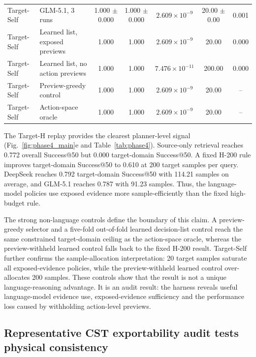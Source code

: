 \documentclass[final,1p,times]{elsarticle}
\begin{document}
\begin{table}[t]
\begin{tabular}{llccccc}
Target-Self & GLM-5.1, 3 runs & 1.000 $\pm$ 0.000 & 1.000 $\pm$ 0.000 & $2.609\times10^{-9}$ & 20.00 $\pm$ 0.00 & 0.001 \\
Target-Self & Learned list, exposed previews & 1.000 & 1.000 & $2.609\times10^{-9}$ & 20.00 & 0.000 \\
Target-Self & Learned list, no action previews & 1.000 & 1.000 & $7.476\times10^{-11}$ & 200.00 & 0.000 \\
Target-Self & Preview-greedy control & 1.000 & 1.000 & $2.609\times10^{-9}$ & 20.00 & -- \\
Target-Self & Action-space oracle & 1.000 & 1.000 & $2.609\times10^{-9}$ & 20.00 & -- \\
\bottomrule
\end{tabular}
\end{table}

The Target-H replay provides the clearest planner-level signal (Fig.~\ref{fig:phase4_main}e and Table~\ref{tab:phase4}). Source-only retrieval reaches 0.772 overall Success@50 but 0.000 target-domain Success@50. A fixed H-200 rule improves target-domain Success@50 to 0.610 at 200 target samples per query. DeepSeek reaches 0.792 target-domain Success@50 with 114.21 samples on average, and GLM-5.1 reaches 0.787 with 91.23 samples. Thus, the language-model policies use exposed evidence more sample-efficiently than the fixed high-budget rule.

The strong non-language controls define the boundary of this claim. A preview-greedy selector and a five-fold out-of-fold learned decision-list control reach the same constrained target-domain ceiling as the action-space oracle, whereas the preview-withheld learned control falls back to the fixed H-200 result. Target-Self further confirms the sample-allocation interpretation: 20 target samples saturate all exposed-evidence policies, while the preview-withheld learned control over-allocates 200 samples. These controls show that the result is not a unique language-reasoning advantage. It is an audit result: the harness reveals useful language-model evidence use, exposed-evidence sufficiency and the performance loss caused by withholding action-level previews.






\subsection{Representative CST exportability audit tests physical consistency}
\end{document}
